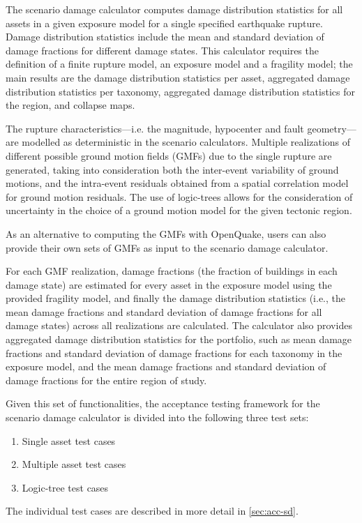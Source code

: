The scenario damage calculator computes damage distribution statistics for all assets in a given exposure model for a single specified earthquake rupture. Damage distribution statistics include the mean and standard deviation of damage fractions for different damage states. This calculator requires the definition of a finite rupture model, an exposure model and a fragility model; the main results are the damage distribution statistics per asset, aggregated damage distribution statistics per taxonomy, aggregated damage distribution statistics for the region, and collapse maps.

The rupture characteristics—i.e. the magnitude, hypocenter and fault geometry—are modelled as deterministic in the scenario calculators. Multiple realizations of different possible ground motion fields (GMFs) due to the single rupture are generated, taking into consideration both the inter-event variability of ground motions, and the intra-event residuals obtained from a spatial correlation model for ground motion residuals. The use of logic-trees allows for the consideration of uncertainty in the choice of a ground motion model for the given tectonic region.

As an alternative to computing the GMFs with OpenQuake, users can also provide their own sets of GMFs as input to the scenario damage calculator.

For each GMF realization, damage fractions (the fraction of buildings in each damage state) are estimated for every asset in the exposure model using the provided fragility model, and finally the damage distribution statistics (i.e., the mean damage fractions and standard deviation of damage fractions for all damage states) across all realizations are calculated. The calculator also provides aggregated damage distribution statistics for the portfolio, such as mean damage fractions and standard deviation of damage fractions for each taxonomy in the exposure model, and the mean damage fractions and standard deviation of damage fractions for the entire region of study.

Given this set of functionalities, the acceptance testing framework for the scenario damage calculator is divided into the following three test sets:

\begin{enumerate}
	\item Single asset test cases
	\item Multiple asset test cases
	\item Logic-tree test cases
\end{enumerate}

The individual test cases are described in more detail in \ref{sec:acc-sd}.